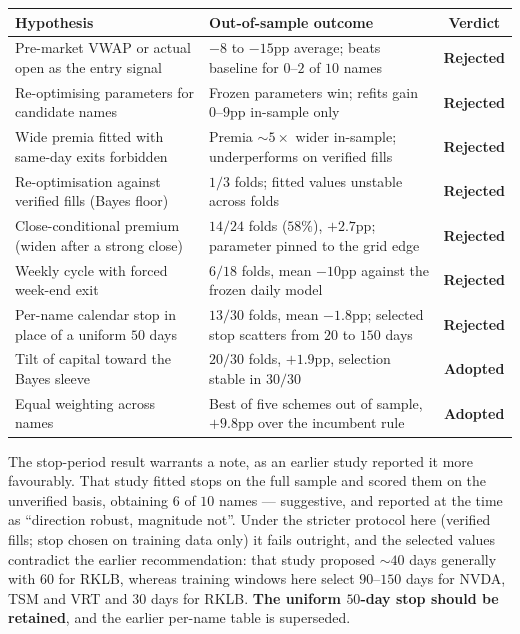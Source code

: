 \documentclass[11pt]{article}
\begin{document}
\begin{table}[H]\centering\small
\renewcommand{\arraystretch}{1.25}
\begin{tabular}{p{5.1cm} p{4.4cm} c}
\toprule
\textbf{Hypothesis} & \textbf{Out-of-sample outcome} & \textbf{Verdict}\\
\midrule
Pre-market VWAP or actual open as the entry signal &
$-8$ to $-15$pp average; beats baseline for $0$--$2$ of $10$ names & \textcolor{bcbad}{\textbf{\color{red}Rejected}}\\
Re-optimising parameters for candidate names &
Frozen parameters win; refits gain $0$--$9$pp in-sample only & {\color{red}\textbf{Rejected}}\\
Wide premia fitted with same-day exits forbidden &
Premia $\sim\!5\times$ wider in-sample; underperforms on verified fills & {\color{red}\textbf{Rejected}}\\
Re-optimisation against verified fills (Bayes floor) &
$1/3$ folds; fitted values unstable across folds & {\color{red}\textbf{Rejected}}\\
Close-conditional premium (widen after a strong close) &
$14/24$ folds ($58\%$), $+2.7$pp; parameter pinned to the grid edge & {\color{red}\textbf{Rejected}}\\
Weekly cycle with forced week-end exit &
$6/18$ folds, mean $-10$pp against the frozen daily model & {\color{red}\textbf{Rejected}}\\
Per-name calendar stop in place of a uniform $50$ days &
$13/30$ folds, mean $-1.8$pp; selected stop scatters from $20$ to $150$ days & {\color{red}\textbf{Rejected}}\\
\rowcolor{bckeep} Tilt of capital toward the Bayes sleeve &
$20/30$ folds, $+1.9$pp, selection stable in $30/30$ & \textbf{Adopted}\\
\rowcolor{bckeep} Equal weighting across names &
Best of five schemes out of sample, $+9.8$pp over the incumbent rule & \textbf{Adopted}\\
\bottomrule
\end{tabular}
\end{table}

The stop-period result warrants a note, as an earlier study reported it more favourably. That
study fitted stops on the full sample and scored them on the unverified basis, obtaining $6$ of
$10$ names --- suggestive, and reported at the time as ``direction robust, magnitude not''. Under
the stricter protocol here (verified fills; stop chosen on training data only) it fails
outright, and the selected values contradict the earlier recommendation: that study proposed
$\sim\!40$ days generally with $60$ for RKLB, whereas training windows here select $90$--$150$
days for NVDA, TSM and VRT and $30$ days for RKLB. \textbf{The uniform $50$-day stop should be
retained}, and the earlier per-name table is superseded.
\end{document}
